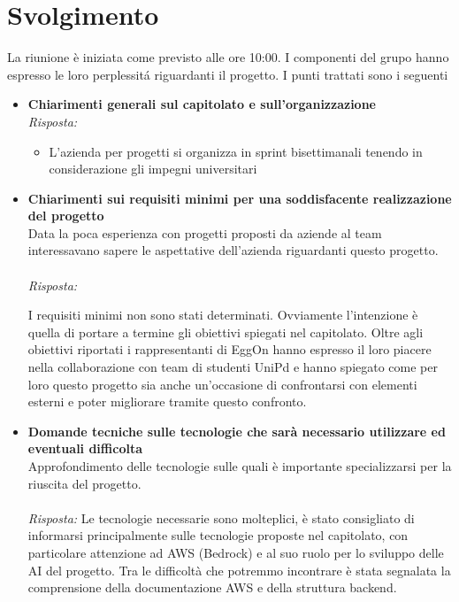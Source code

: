 \documentclass[a4paper,12pt]{article}
\begin{document}
\section{Svolgimento}
    La riunione è iniziata come previsto alle ore 10:00. I componenti del grupo hanno espresso le loro perplessitá riguardanti il progetto. I punti trattati sono i seguenti
    \begin{itemize}
    \item \textbf{Chiarimenti generali sul capitolato e sull'organizzazione}\\
    \noindent
    \textit{Risposta:} \\
    \begin{itemize}
        \item L'azienda per progetti si organizza in sprint bisettimanali tenendo in considerazione gli impegni universitari
    \end{itemize}
    
    \vspace{1em}

    \item \textbf{Chiarimenti sui requisiti minimi per una soddisfacente realizzazione del progetto}\\
    \noindent
    Data la poca esperienza con progetti proposti da aziende al team interessavano sapere le aspettative dell'azienda riguardanti questo progetto. 
    \\ \\
    \textit{Risposta:} 
    
    I requisiti minimi non sono stati determinati. Ovviamente l'intenzione è quella di portare a termine gli obiettivi spiegati nel capitolato. Oltre agli obiettivi riportati i rappresentanti di EggOn hanno espresso il loro piacere nella collaborazione con team di studenti UniPd e hanno spiegato come per loro questo progetto sia anche un'occasione di confrontarsi con elementi esterni e poter migliorare tramite questo confronto.
    
    \vspace{1em}

    \item \textbf{Domande tecniche sulle tecnologie che sarà necessario utilizzare ed eventuali difficolta}\\
    \noindent
    Approfondimento delle tecnologie sulle quali è importante specializzarsi per la riuscita del progetto.\\ \\
    \textit{Risposta:} 
    Le tecnologie necessarie sono molteplici, è stato consigliato di informarsi principalmente sulle tecnologie proposte nel capitolato, con particolare attenzione ad AWS (Bedrock) e al suo ruolo per lo sviluppo delle AI del progetto. Tra le difficoltà che potremmo incontrare è stata segnalata la comprensione della documentazione AWS e della struttura backend.
    \vspace{1em}


\end{itemize}
\end{document}
